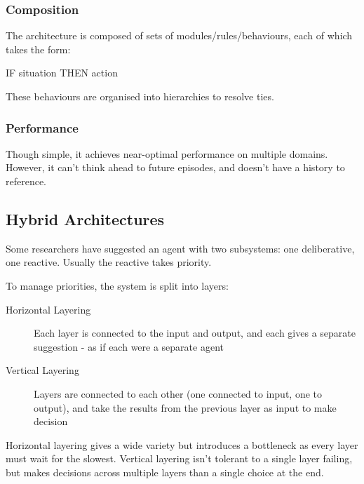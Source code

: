 \subsubsection{Composition}
The architecture is composed of sets of modules/rules/behaviours, each of which takes the form:
\begin{center}
    IF situation THEN action
\end{center}
These behaviours are organised into hierarchies to resolve ties. 

\subsubsection{Performance}
Though simple, it achieves near-optimal performance on multiple domains. However, it can't think ahead to future episodes, and doesn't have a history to reference. 

\subsection{Hybrid Architectures}
Some researchers have suggested an agent with two subsystems: one deliberative, one reactive. Usually the reactive takes priority.

To manage priorities, the system is split into layers:
\begin{description}
    \item[Horizontal Layering] Each layer is connected to the input and output, and each gives a separate suggestion - as if each were a separate agent
    \item[Vertical Layering] Layers are connected to each other (one connected to input, one to output), and take the results from the previous layer as input to make decision
\end{description}

Horizontal layering gives a wide variety but introduces a bottleneck as every layer must wait for the slowest. Vertical layering isn't tolerant to a single layer failing, but makes decisions across multiple layers than a single choice at the end. 
